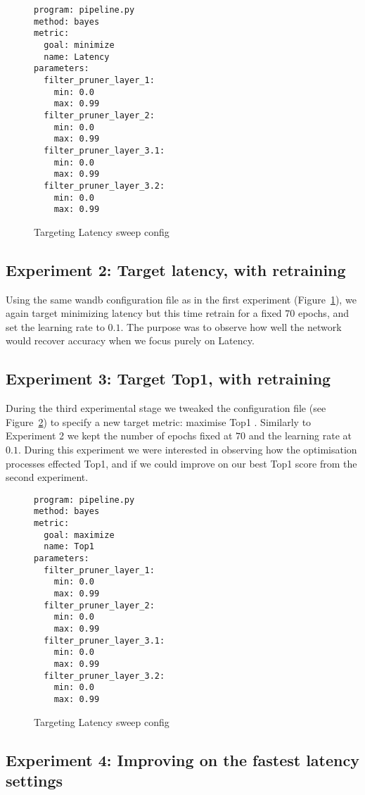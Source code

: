 \documentclass[../Dissertation.tex]{subfiles}
\begin{document}
\singlespacing
\begin{figure}[H]
    \centering
    \begin{verbatim}
program: pipeline.py
method: bayes
metric:
  goal: minimize
  name: Latency
parameters:
  filter_pruner_layer_1:
    min: 0.0
    max: 0.99
  filter_pruner_layer_2:
    min: 0.0
    max: 0.99
  filter_pruner_layer_3.1:
    min: 0.0
    max: 0.99
  filter_pruner_layer_3.2:
    min: 0.0
    max: 0.99
    \end{verbatim}
    \caption{Targeting Latency sweep config}
    \label{fig:LatencySweepConfig}
\end{figure}
\doublespacing

\subsection{Experiment 2: Target latency, with retraining}

Using the same \acrshort{wandb} configuration file as in the first experiment (Figure~\ref{fig:LatencySweepConfig}), we again target minimizing latency but this time retrain for a fixed $70$ epochs, and set the learning rate to $0.1$.
The purpose was to observe how well the network would recover accuracy when we focus purely on Latency.

\subsection{Experiment 3: Target Top1, with retraining}
During the third experimental stage we tweaked the configuration file (see Figure~\ref{fig:Top1SweepConfig}) to specify a new target metric: maximise Top1 .
Similarly to Experiment 2 we kept the number of epochs fixed at $70$ and the learning rate at $0.1$.
During this experiment we were interested in observing how the optimisation processes effected Top1, and if we could improve on our best Top1 score from the second experiment.

\singlespacing
\begin{figure}[H]
    \centering
    \begin{verbatim}
program: pipeline.py
method: bayes
metric:
  goal: maximize
  name: Top1
parameters:
  filter_pruner_layer_1:
    min: 0.0
    max: 0.99
  filter_pruner_layer_2:
    min: 0.0
    max: 0.99
  filter_pruner_layer_3.1:
    min: 0.0
    max: 0.99
  filter_pruner_layer_3.2:
    min: 0.0
    max: 0.99
    \end{verbatim}
    \caption{Targeting Latency sweep config}
    \label{fig:Top1SweepConfig}
\end{figure}
\doublespacing

\subsection{Experiment 4: Improving on the fastest latency settings}
\end{document}
